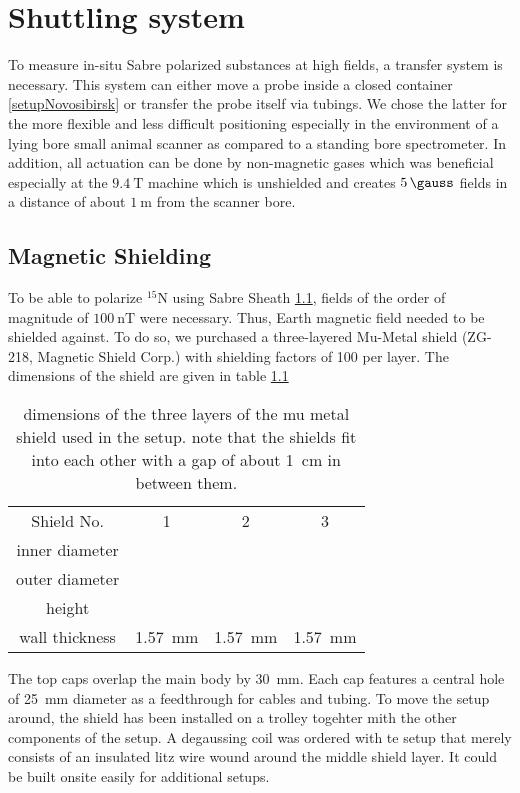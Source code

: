    \section{Shuttling system}\label{sec:shuttlingSystem}
        To measure in-situ Sabre polarized substances at high fields, a transfer system is
        necessary. This system can either move a probe inside a closed container
        \ref{setupNovosibirsk} or transfer the probe itself via tubings. We chose the latter for the
        more flexible and less difficult positioning especially in the environment of a lying bore
        small animal scanner as compared to a standing bore spectrometer. In addition, all actuation
        can be done by non-magnetic gases which was beneficial especially at the $\SI{9.4}{\tesla}$
        machine which is unshielded and creates $\SI{5}{\gauss}$ fields in a distance of about $\SI{1}{\meter}$ from
        the scanner bore.
        \subsection{Magnetic Shielding}
        To be able to polarize $^{15}\mathrm{N}$ using Sabre Sheath \ref{}, fields of the order of
            magnitude of $\SI{100}{\nano\tesla}$ were necessary. Thus, Earth magnetic field needed to
            be shielded against. To do so, we purchased a three-layered Mu-Metal shield (ZG-218, Magnetic
            Shield Corp.) with shielding factors of 100 per layer. The dimensions of the shield are given in table \ref{}
            \begin{table}
                \centering
                \begin{tabular}{cccc}
                    Shield No. & 1 & 2 & 3 \\
                    inner diameter & & & \\
                    outer diameter & & & \\
                    height & & &\\
                    wall thickness &\SI{1.57}{\mm}&\SI{1.57}{\mm}&\SI{1.57}{\mm} 
                \end{tabular}
                \caption[shield dimensions]{dimensions of the three layers of the mu metal shield used in the setup. note that the shields  fit into each other with a gap of about \SI{1}{\cm} in between them.}
            \end{table}
            The top caps overlap the main body by \SI{30}{\mm}.  Each cap features a central hole of \SI{25}{\mm} diameter as a feedthrough for cables and tubing.  To move the setup around, the shield has been installed on a trolley togehter mith the other components of the setup.  A degaussing coil was ordered with te setup that merely consists of an insulated litz wire wound around the middle shield layer.  It could be built onsite easily for additional setups.
